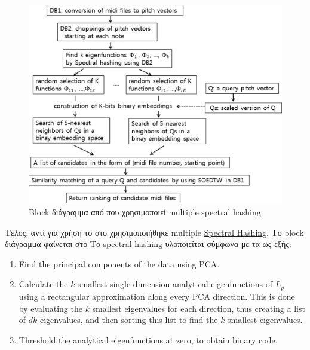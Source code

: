 \begin{figure}
        \centering
        \vspace{-20pt}\includegraphics[width=\linewidth]{park2015query}
        \vspace{-20pt}\caption{Block διάγραμμα από \protect\cite{park2015query} που χρησιμοποιεί multiple spectral hashing}
        \label{fig:park2015query}
\end{figure}

Τέλος, αντί για χρήση \lsh{} το \citeyear{park2015query} στο \cite{park2015query} χρησιμοποιήθηκε multiple \href{https://en.wikipedia.org/wiki/Spectral_Hash}{Spectral Hashing}.
Το block διάγραμμα φαίνεται στο 
Το spectral hashing υλοποιείται σύμφωνα με τα \cite{weiss2009spectral,weiss2009spectral-blog} ως εξής:
\begin{enumerate}
\item Find the principal components of the data using PCA.
\item Calculate the $k$ smallest single-dimension analytical eigenfunctions of $L_p$ using a rectangular approximation along every PCA direction.
This is done by evaluating the $k$ smallest eigenvalues for each direction, thus creating a list of $dk$ eigenvalues, and then sorting this list to find the $k$ smallest eigenvalues.
\item Threshold the analytical eigenfunctions at zero, to obtain binary code.
\end{enumerate}

\undef{\ls}
\undef{\lsh}
\forceendwrapfig{}
